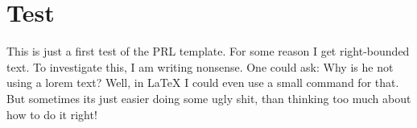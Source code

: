 \section{Test}
This is just a first test of the PRL template. 
For some reason I get right-bounded text. To investigate this, I am writing nonsense. 
One could ask: Why is he not using a lorem text? Well, in LaTeX I could even use a small command for that. 
But sometimes its just easier doing some ugly shit, than thinking too much about how to do it right!

\Blindtext[10]
